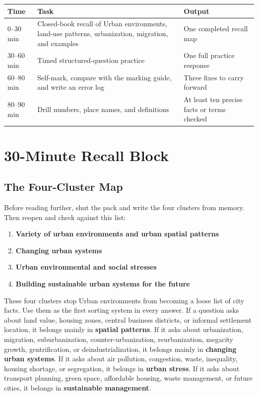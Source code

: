 \documentclass[11pt,a4paper]{article}
\newcommand{\term}[1]{\textcolor{HeadingBlue}{\textbf{#1}}}
\begin{document}
\begin{tabularx}{\textwidth}{L{0.16\textwidth}Y L{0.24\textwidth}}
\toprule
\textbf{Time} & \textbf{Task} & \textbf{Output} \\
--30 min & Closed-book recall of Urban environments, land-use patterns,
urbanization, migration, and examples & One completed recall map \\
30--60 min & Timed structured-question practice & One full practice response \\
60--80 min & Self-mark, compare with the marking guide, and write an error log
& Three fixes to carry forward \\
80--90 min & Drill numbers, place names, and definitions & At least ten precise
facts or terms checked \\
\bottomrule
\end{tabularx}

\section{30-Minute Recall Block}

\subsection{The Four-Cluster Map}

Before reading further, shut the pack and write the four clusters from memory.
Then reopen and check against this list:

\begin{enumerate}
  \item \term{Variety of urban environments and urban spatial patterns}
  \item \term{Changing urban systems}
  \item \term{Urban environmental and social stresses}
  \item \term{Building sustainable urban systems for the future}
\end{enumerate}

These four clusters stop Urban environments from becoming a loose list of city
facts. Use them as the first sorting system in every answer. If a question asks
about land value, housing zones, central business districts, or informal
settlement location, it belongs mainly in \term{spatial patterns}. If it asks
about urbanization, migration, suburbanization, counter-urbanization,
reurbanization, megacity growth, gentrification, or deindustrialization, it
belongs mainly in \term{changing urban systems}. If it asks about air pollution,
congestion, waste, inequality, housing shortage, or segregation, it belongs in
\term{urban stress}. If it asks about transport planning, green space,
affordable housing, waste management, or future cities, it belongs in
\term{sustainable management}.
\end{document}
